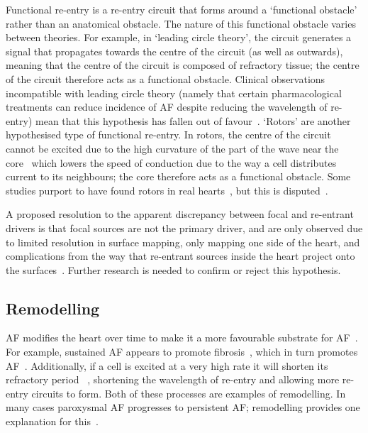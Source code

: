 Functional re-entry is a re-entry circuit that forms around a `functional obstacle' rather than an anatomical obstacle. The nature of this functional obstacle varies between theories. For example, in `leading circle theory', the circuit generates a signal that propagates towards the centre of the circuit (as well as outwards), meaning that the centre of the circuit is composed of refractory tissue; the centre of the circuit therefore acts as a functional obstacle. Clinical observations incompatible with leading circle theory (namely that certain pharmacological treatments can reduce incidence of AF despite reducing the wavelength of re-entry) mean that this hypothesis has fallen out of favour~\cite{calkins2007hrs}.
`Rotors' are another hypothesised type of functional re-entry. In rotors, the centre of the circuit cannot be excited due to the high curvature of the part of the wave near the core~\cite{waks2014mechanisms} which lowers the speed of conduction due to the way a cell distributes current to its neighbours; the core therefore acts as a functional obstacle. Some studies purport to have found rotors in real hearts~\cite{Narayan1761}, but this is disputed~\cite{calkins2007hrs}.

A proposed resolution to the apparent discrepancy between focal and re-entrant drivers is that focal sources are not the primary driver, and are only observed due to limited resolution in surface mapping, only mapping one side of the heart, and complications from the way that re-entrant sources inside the heart project onto the surfaces~\cite{hansen}. Further research is needed to confirm or reject this hypothesis.
	
\subsection{Remodelling} \label{subsec:remodelling}

AF modifies the heart over time to make it a more favourable substrate for AF~\cite{wijffels1995atrial}. For example, sustained AF appears to promote fibrosis~\cite{burstein2007atrial, CORRADI20141250}, which in turn promotes AF~\cite{de2011fibrosis}. Additionally, if a cell is excited at a very high rate it will shorten its refractory period%
~\cite{gaspo1997functional}, shortening the wavelength of re-entry and allowing more re-entry circuits to form. Both of these processes are examples of remodelling. In many cases paroxysmal AF progresses to persistent AF; remodelling provides one explanation for this~\cite{deVos2010progression}.

